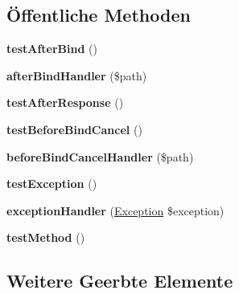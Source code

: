 \subsection*{Öffentliche Methoden}
\begin{DoxyCompactItemize}
\item 
\mbox{\label{class_sabre_1_1_d_a_v_1_1_server_events_test_a70632b94dda17910eb23b0e155ff31c8}} 
{\bfseries test\+After\+Bind} ()
\item 
\mbox{\label{class_sabre_1_1_d_a_v_1_1_server_events_test_a96a84eb1a288c53752e5998e23c67919}} 
{\bfseries after\+Bind\+Handler} (\$path)
\item 
\mbox{\label{class_sabre_1_1_d_a_v_1_1_server_events_test_af12728e498ffc423c45cc3b3a3a62686}} 
{\bfseries test\+After\+Response} ()
\item 
\mbox{\label{class_sabre_1_1_d_a_v_1_1_server_events_test_a4aa0e7e60326cd2ff24901239db23a3f}} 
{\bfseries test\+Before\+Bind\+Cancel} ()
\item 
\mbox{\label{class_sabre_1_1_d_a_v_1_1_server_events_test_a1d7c861c874672fef0ddef9a9808e366}} 
{\bfseries before\+Bind\+Cancel\+Handler} (\$path)
\item 
\mbox{\label{class_sabre_1_1_d_a_v_1_1_server_events_test_a620dc517ed6e0261cd05b0b77e8c57e7}} 
{\bfseries test\+Exception} ()
\item 
\mbox{\label{class_sabre_1_1_d_a_v_1_1_server_events_test_a13bb3b4a60b1cc0075ce144cf2e39efe}} 
{\bfseries exception\+Handler} (\mbox{\hyperlink{class_sabre_1_1_d_a_v_1_1_exception}{Exception}} \$exception)
\item 
\mbox{\label{class_sabre_1_1_d_a_v_1_1_server_events_test_a9db2ae5b59b12dfafcf3605c774912cb}} 
{\bfseries test\+Method} ()
\end{DoxyCompactItemize}
\subsection*{Weitere Geerbte Elemente}


